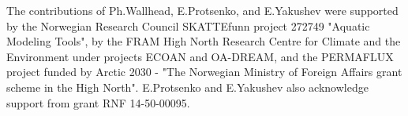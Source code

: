 \documentclass[gmd, manuscript]{copernicus}
\begin{document}










\begin{acknowledgements}
The contributions of Ph.Wallhead, E.Protsenko, and E.Yakushev were supported by the Norwegian Research Council SKATTEfunn project 272749 "Aquatic Modeling Tools", by the FRAM High North Research Centre for Climate and the Environment under projects ECOAN and OA-DREAM, and the PERMAFLUX project funded by Arctic 2030 - "The Norwegian Ministry of Foreign Affairs grant scheme in the High North". E.Protsenko and E.Yakushev also acknowledge support from grant RNF 14-50-00095.
\end{acknowledgements}









\end{document}
